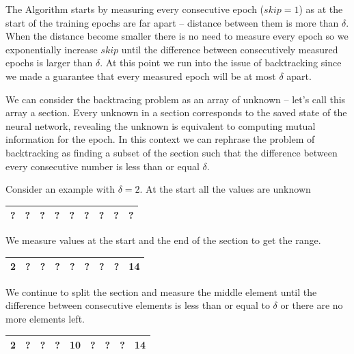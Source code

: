 \documentclass[dissertation.tex]{subfiles}
\begin{document}
  The Algorithm starts by measuring every consecutive epoch ($skip = 1$) as at
  the start of the training epochs are far apart -- distance between them is
  more than $\delta$. When the distance become smaller there is no need to
  measure every epoch so we exponentially increase $skip$ until the difference
  between consecutively measured epochs is larger than $\delta$. At this point
  we run into the issue of backtracking since we made a guarantee that every
  measured epoch will be at most $\delta$ apart.

  We can consider the backtracing problem as an array of unknown -- let's call
  this array a section. Every unknown in a section corresponds to the saved
  state of the neural network, revealing the unknown is equivalent to computing
  mutual information for the epoch. In this context we can rephrase the problem
  of backtracking as finding a subset of the section such that the difference
  between every consecutive number is less than or equal $\delta$.

  Consider an example with $\delta = 2$.
  At the start all the values are unknown 

  \begin{table}[H]
    \centering
      \begin{tabular}{|c|c|c|c|c|c|c|c|c|}
      \hline			
        ?&?&?&?&?&?&?&?&? \\
      \hline  
    \end{tabular}
  \end{table}

  We measure values at the start and the end of the section to get the range.

  \begin{table}[H]
    \centering
      \begin{tabular}{|c|c|c|c|c|c|c|c|c|}
      \hline			
        \bf{2}&?&?&?&?&?&?&?&\bf{14}\\
      \hline  
    \end{tabular}
  \end{table}

  We continue to split the section and measure the middle element until the
  difference between consecutive elements is less than or equal to $\delta$ or
  there are no more elements left.


  \begin{table}[H]
    \centering
      \begin{tabular}{|c|c|c|c|c|c|c|c|c|}
      \hline			
        2&?&?&?&\bf{10}&?&?&?&14\\
      \hline  
    \end{tabular}
  \end{table}
\end{document}
